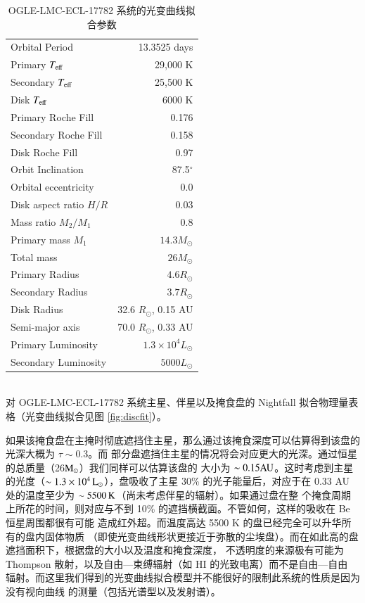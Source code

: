 {\renewcommand{\arraystretch}{1.4}
\begin{table}
\caption{OGLE-LMC-ECL-17782 系统的光变曲线拟合参数}
\label{tbl:discparam}
\centering
\begin{tabularx}{0.9\textwidth}{@{\extracolsep{\fill}}lr}
\hline
Orbital Period & 13.3525 days \\
Primary $T_\mathrm{eff}$  & 29,000  K  \\
Secondary $T_\mathrm{eff}$  & 25,500 K   \\
Disk $T_\mathrm{eff}$  & 6000 K  \\
Primary Roche Fill & 0.176\\
Secondary Roche Fill & 0.158\\
Disk  Roche Fill & 0.97 \\
Orbit Inclination & 87.5$^\circ$ \\
Orbital eccentricity & 0.0 \\
Disk aspect ratio $H/R$  & 0.03 \\
Mass ratio $M_2/M_1$ & 0.8 \\
Primary mass $M_1$     &  $14.3 M_\odot$ \\
Total mass  & $26 M_\odot$ \\
Primary Radius  & $4.6 R_\odot$ \\
Secondary Radius & $3.7 R_\odot$ \\
Disk Radius  & 32.6 $R_\odot$, 0.15 AU \\
Semi-major axis & 70.0 $R_\odot$, 0.33 AU \\
Primary Luminosity & $1.3 \times 10^4 L_\odot $\\ 
Secondary Luminosity & $5000 L_\odot $\\ 
\hline
\end{tabularx}
\medskip \\
对 OGLE-LMC-ECL-17782 系统主星、伴星以及掩食盘的 Nightfall 拟合物理量表格（光变曲线拟合见图 \ref{fig:discfit}）。
\end{table}
}

如果该掩食盘在主掩时彻底遮挡住主星，那么通过该掩食深度可以估算得到该盘的光深大概为 $\tau \sim 0.3$。而
部分盘遮挡住主星的情况将会对应更大的光深。通过恒星的总质量（26$\mathrm{M}_\odot$）我们同样可以估算该盘的
大小为 $\sim 0.15\mathrm{AU}$。这时考虑到主星的光度（$\sim  1.3\times 10^4\,\rm{L_\odot}$），盘吸收了主星 30\% 
的光子能量后，对应于在 0.33 AU 处的温度至少为 $\sim 5500\,\mathrm{K}$（尚未考虑伴星的辐射）。如果通过盘在整
个掩食周期上所花的时间，则对应与不到 10\% 的遮挡横截面。不管如何，这样的吸收在 Be 恒星周围都很有可能
造成红外超\cite{Waters1988,Dougherty1994}。而温度高达 5500 K 的盘已经完全可以升华所有的盘内固体物质
（即使光变曲线形状更接近于弥散的尘埃盘）。而在如此高的盘遮挡面积下，根据盘的大小以及温度和掩食深度，
不透明度的来源极有可能为 Thompson 散射，以及自由---束缚辐射（如 H\textsc{I} 的光致电离）而不是自由---自由
辐射\cite{Rivinius2013}。而这里我们得到的光变曲线拟合模型并不能很好的限制此系统的性质是因为没有视向曲线
的测量（包括光谱型以及发射谱）。

